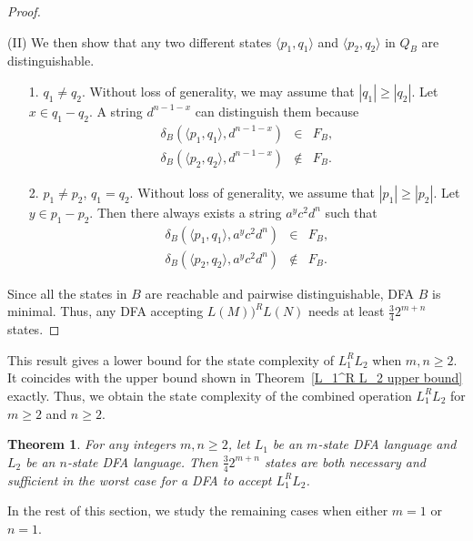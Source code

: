 \documentclass[10pt]{article}
\newtheorem{theorem}{Theorem}
\begin{document}
\begin{proof}
\begin{itemize}
\end{itemize}

(II) We then show that any two different states $\langle
p_1,q_1\rangle$ and $\langle p_2,q_2\rangle$ in $Q_B$ are
distinguishable.

\begin{itemize}

\item[{\rm 1.}]$q_1\neq q_2$.
Without loss of generality, we may assume that $|q_1|\geq |q_2|$. Let $x\in q_1-q_2$. A string $d^{n-1-x}$ can distinguish them because
\begin{eqnarray*}
\delta_B(\langle p_1,q_1\rangle, d^{n-1-x})& \in & F_B,\\
\delta_B(\langle p_2,q_2\rangle, d^{n-1-x}) & \notin & F_B.
\end{eqnarray*}

\item[{\rm 2.}]$p_1\neq p_2$, $q_1= q_2$. Without loss of generality, we assume that $|p_1|\geq |p_2|$. Let $y\in p_1-p_2$. Then there always exists a string $a^yc^2d^{n}$ such that
\begin{eqnarray*}
\delta_B(\langle p_1,q_1\rangle, a^yc^2d^{n})& \in & F_B,\\
\delta_B(\langle p_2,q_2\rangle, a^yc^2d^{n}) & \notin & F_B.
\end{eqnarray*}

\end{itemize}
Since all the states in $B$ are reachable and pairwise
distinguishable, DFA $B$ is minimal. Thus, any DFA accepting
$L(M))^RL(N)$ needs at least $\frac{3}{4}2^{m+n}$ states.
\end{proof}

This result gives a lower bound for the state complexity of
$L_1^RL_2$ when $m,n \ge 2$. It coincides with the upper bound shown
in Theorem~\ref{L_1^R L_2 upper bound} exactly. Thus, we obtain the
state complexity of the combined operation $L_1^RL_2$ for $m \ge 2$
and $n\ge 2$.
\begin{theorem}
\label{L_1^R L_2 state complexity} For any integers $m, n\geq 2$,
let $L_1$ be an $m$-state DFA language and $L_2$ be an $n$-state DFA
language. Then $\frac{3}{4}2^{m+n}$ states are both necessary and
sufficient in the worst case for a DFA to accept $L_1^RL_2$.
\end{theorem}



In the rest of this section, we study the remaining cases when
either $m =1$ or $n=1$.
\end{document}
